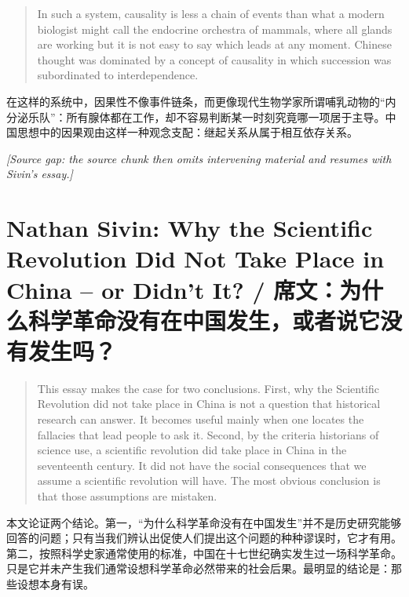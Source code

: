 \documentclass[UTF8,zihao=-4]{ctexart}
\newenvironment{enblock}
  {\par\smallskip\noindent{\scriptsize\bfseries English}\par\begin{quote}\small}
  {\end{quote}}
\newenvironment{zhblock}
  {\par\noindent{\scriptsize\bfseries 中文}\par}
  {\par\medskip}
\newcommand{\gapnote}[1]{\par\smallskip\noindent\textit{[Source gap: #1]}\par\smallskip}
\begin{document}
\begin{enblock}
In such a system, causality is less a chain of events than what a modern biologist might call the endocrine orchestra of mammals, where all glands are working but it is not easy to say which leads at any moment. Chinese thought was dominated by a concept of causality in which succession was subordinated to interdependence.
\end{enblock}
\begin{zhblock}
在这样的系统中，因果性不像事件链条，而更像现代生物学家所谓哺乳动物的“内分泌乐队”：所有腺体都在工作，却不容易判断某一时刻究竟哪一项居于主导。中国思想中的因果观由这样一种观念支配：继起关系从属于相互依存关系。
\end{zhblock}

\gapnote{the source chunk then omits intervening material and resumes with Sivin's essay.}

\section*{Nathan Sivin: Why the Scientific Revolution Did Not Take Place in China -- or Didn't It? / 席文：为什么科学革命没有在中国发生，或者说它没有发生吗？}

\begin{enblock}
This essay makes the case for two conclusions. First, why the Scientific Revolution did not take place in China is not a question that historical research can answer. It becomes useful mainly when one locates the fallacies that lead people to ask it. Second, by the criteria historians of science use, a scientific revolution did take place in China in the seventeenth century. It did not have the social consequences that we assume a scientific revolution will have. The most obvious conclusion is that those assumptions are mistaken.
\end{enblock}
\begin{zhblock}
本文论证两个结论。第一，“为什么科学革命没有在中国发生”并不是历史研究能够回答的问题；只有当我们辨认出促使人们提出这个问题的种种谬误时，它才有用。第二，按照科学史家通常使用的标准，中国在十七世纪确实发生过一场科学革命。只是它并未产生我们通常设想科学革命必然带来的社会后果。最明显的结论是：那些设想本身有误。
\end{zhblock}
\end{document}
